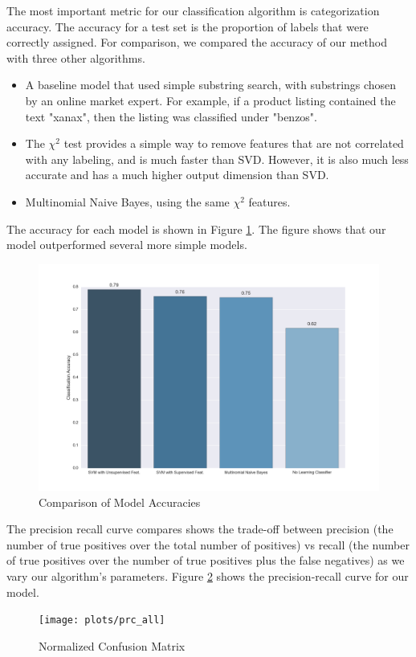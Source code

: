 The most important metric for our classification algorithm is categorization
accuracy. The accuracy for a test set is the proportion of labels that were
correctly assigned. For comparison, we compared the accuracy of our method with
three other algorithms.
\begin{itemize}
    \item A baseline model that used simple substring search, with substrings chosen by an online market expert.
					For example, if a product listing contained the text "xanax", then the listing was classified under "benzos".
    \item The $\chi^2$ test provides a simple way to remove features that are not correlated with any
					labeling, and is much faster than SVD.  However, it is also much less accurate and has a much higher output dimension than SVD.
    \item Multinomial Naive Bayes, using the same $\chi^2$ features.
\end{itemize}
The accuracy for each model is shown in Figure \ref{accuracy}. The figure shows
that our model outperformed several more simple models.

\begin{figure}[htbp]
    \includegraphics[width=\linewidth]{plots/models_accuracy}
    \caption{Comparison of Model Accuracies}
    \label{accuracy}
\end{figure}



The precision recall curve compares shows the trade-off between precision (the
number of true positives over the total number of positives) vs recall (the
number of true positives over the number of true positives plus the false
negatives) as we vary our algorithm's parameters.
Figure \ref{prc_all} shows the precision-recall curve for our model.
\begin{figure}[htbp]
    \texttt{[image: plots/prc\_all]}
    \caption{Normalized Confusion Matrix}
    \label{prc_all}
\end{figure}

